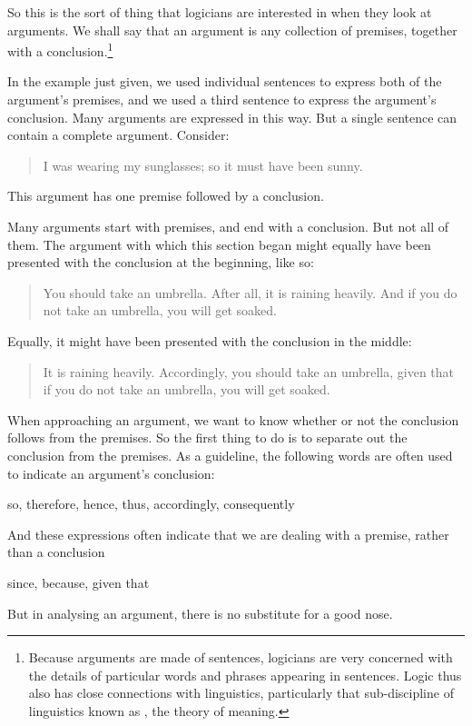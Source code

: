 So this is the sort of thing that logicians are interested in when they look at arguments. We shall say that an argument is any collection of premises, together with a conclusion.\footnote{Because arguments are made of sentences, logicians are very concerned with the details of particular words and phrases appearing in sentences. Logic thus also has close connections with linguistics, particularly that sub-discipline of linguistics known as , the theory of meaning.}

In the example just given, we used individual sentences to express both of the argument's premises, and we used a third sentence to express the argument's conclusion. Many arguments are expressed in this way. But a single sentence can contain a complete argument. Consider:
	\begin{quote}
		 I was wearing my sunglasses; so it must have been sunny.
	\end{quote}
This argument has one premise followed by a conclusion. 

Many arguments start with premises, and end with a conclusion. But not all of them. The argument with which this section began might equally have been presented with the conclusion at the beginning, like so:
	\begin{quote}
		You should take an umbrella. After all, it is raining heavily. And if you do not take an umbrella, you will get soaked. 
	\end{quote}
Equally, it might have been presented with the conclusion in the middle:
	\begin{quote}
		It is raining heavily. Accordingly, you should take an umbrella, given that if you do not take an umbrella, you will get soaked.
	\end{quote}
When approaching an argument, we want to know whether or not the conclusion follows from the premises. So the first thing to do is to separate out the conclusion from the premises. As a guideline, the following words are often used to indicate an argument's conclusion:
	\begin{center}
		so, therefore, hence, thus, accordingly, consequently
	\end{center}
And these expressions often indicate that we are dealing with a premise, rather than a conclusion
	\begin{center}
		since, because, given that
	\end{center}
But in analysing an argument, there is no substitute for a good nose.


